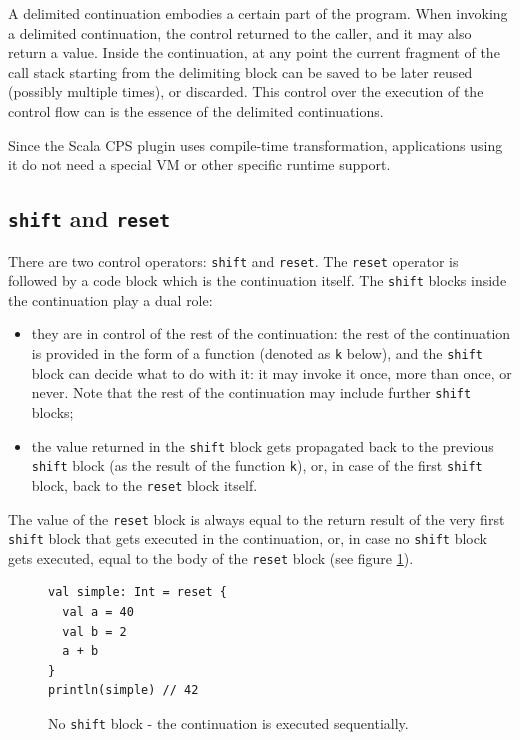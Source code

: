 A delimited continuation embodies a certain part of the program. When invoking a delimited continuation, the control returned to the caller, and it may also return a value. Inside the continuation, at any point the current fragment of the call stack starting from the delimiting block can be saved to be later reused (possibly multiple times), or discarded. This control over the execution of the control flow can is the essence of the delimited continuations.

Since the Scala CPS plugin uses compile-time transformation, applications using it do not need a special VM or other specific runtime support.

\subsection{\texttt{shift} and \texttt{reset}}

There are two control operators: \texttt{shift} and \texttt{reset}. The \texttt{reset} operator is followed by a code block which is the continuation itself. The \texttt{shift} blocks inside the continuation play a dual role: 
\begin{itemize}
\item they are in control of the rest of the continuation: the rest of the continuation is provided in the form of a function (denoted as \texttt{k} below), and the \texttt{shift} block can decide what to do with it: it may invoke it once, more than once, or never. Note that the rest of the continuation may include further \texttt{shift} blocks;
\item the value returned in the \texttt{shift} block gets propagated back to the previous \texttt{shift} block (as the result of the function \texttt{k}), or, in case of the first \texttt{shift} block, back to the \texttt{reset} block itself.
\end{itemize}

The value of the \texttt{reset} block is always equal to the return result of the very first \texttt{shift} block that gets executed in the continuation, or, in case no \texttt{shift} block gets executed, equal to the body of the \texttt{reset} block (see figure  \ref{fig:example_cps_no_shift}).

\begin{figure}[h!] 
\begin{lstlisting}
val simple: Int = reset {
  val a = 40
  val b = 2
  a + b
}
println(simple) // 42
\end{lstlisting}
\caption{No \texttt{shift} block - the continuation is executed sequentially.}
\label{fig:example_cps_no_shift}
\end{figure}

